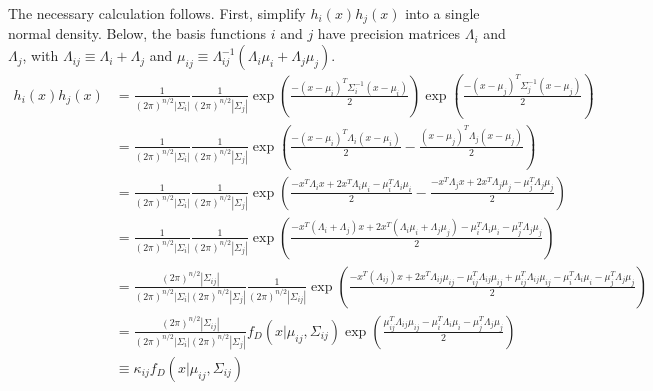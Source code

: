 \documentclass{article}
\begin{document}
The necessary calculation follows. First, simplify $h_i(x)h_j(x)$ into a single normal density. Below, the basis functions $i$ and $j$ have precision matrices $\Lambda_i$ and $\Lambda_j$, with $\Lambda_{ij}\equiv \Lambda_i+\Lambda_j$ and $\mu_{ij}\equiv \Lambda_{ij}^{-1}(\Lambda_i\mu_i+\Lambda_j\mu_j)$.
\begin{align*}
h_i(x)h_j(x) 
&=\frac{1}{(2\pi)^{n/2}|\Sigma_i|}
\frac{1}{(2\pi)^{n/2}|\Sigma_j|}
\exp(\frac{-(x-\mu_i)^T\Sigma_i^{-1}(x-\mu_i)}{2})
\exp(\frac{-(x-\mu_j)^T\Sigma_j^{-1}(x-\mu_j)}{2})\\
&=\frac{1}{(2\pi)^{n/2}|\Sigma_i|}
\frac{1}{(2\pi)^{n/2}|\Sigma_j|}
\exp(\frac{-(x-\mu_i)^T\Lambda_i(x-\mu_i)}{2}-\frac{(x-\mu_j)^T\Lambda_j(x-\mu_j)}{2})\\
&=\frac{1}{(2\pi)^{n/2}|\Sigma_i|}
\frac{1}{(2\pi)^{n/2}|\Sigma_j|}
\exp(\frac{-x^T\Lambda_ix+2x^T\Lambda_i\mu_i-\mu_i^T\Lambda_i\mu_i}{2}-\frac{-x^T\Lambda_jx+2x^T\Lambda_j\mu_j-\mu_j^T\Lambda_j\mu_j}{2})\\
&=\frac{1}{(2\pi)^{n/2}|\Sigma_i|}
\frac{1}{(2\pi)^{n/2}|\Sigma_j|}
\exp(\frac{-x^T(\Lambda_i+\Lambda_j)x
+2x^T(\Lambda_i\mu_i+\Lambda_j\mu_j)
-\mu_i^T\Lambda_i\mu_i-\mu_j^T\Lambda_j\mu_j}{2})\\
&=\frac{(2\pi)^{n/2}|\Sigma_{ij}|}{(2\pi)^{n/2}|\Sigma_i|(2\pi)^{n/2}|\Sigma_j|}
\frac{1}{(2\pi)^{n/2}|\Sigma_{ij}|}
\exp(\frac{
	-x^T(\Lambda_{ij})x 
	+2x^T\Lambda_{ij}\mu_{ij}
	-\mu_{ij}^T\Lambda_{ij}\mu_{ij}
	+\mu_{ij}^T\Lambda_{ij}\mu_{ij}
	-\mu_i^T\Lambda_i\mu_i-\mu_j^T\Lambda_j\mu_j
}{2})\\
&=\frac{(2\pi)^{n/2}|\Sigma_{ij}|}{(2\pi)^{n/2}|\Sigma_i|(2\pi)^{n/2}|\Sigma_j|}
 f_D(x|\mu_{ij}, \Sigma_{ij})
\exp(\frac{
	\mu_{ij}^T\Lambda_{ij}\mu_{ij}
	-\mu_i^T\Lambda_i\mu_i-\mu_j^T\Lambda_j\mu_j
}{2})\\
&\equiv \kappa_{ij} f_D(x|\mu_{ij}, \Sigma_{ij})\\
\end{align*}
\end{document}

